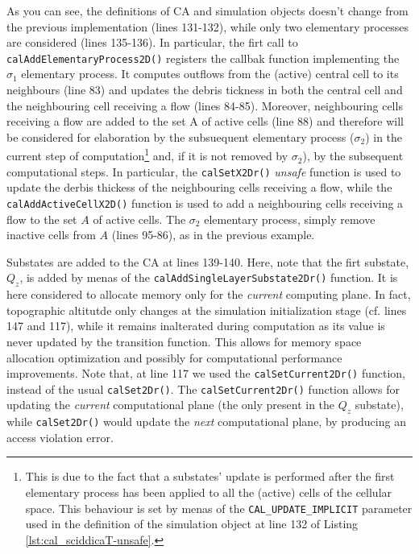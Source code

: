 As you can see, the definitions of CA and simulation objects doesn't
change from the previous implementation (lines 131-132), while only
two elementary processes are considered (lines 135-136). In
particular, the firt call to \verb'calAddElementaryProcess2D()'
registers the callbak function implementing the $\sigma_1$ elementary
process. It computes outflows from the (active) central cell to its
neighbours (line 83) and updates the debris tickness in both the
central cell and the neighbouring cell receiving a flow (lines
84-85). Moreover, neighbouring cells receiving a flow are added to the
set A of active cells (line 88) and therefore will be considered for
elaboration by the subsuequent elementary process ($\sigma_2$) in the
current step of computation\footnote{This is due to the fact that a
  substates' update is performed after the first elementary process
  has been applied to all the (active) cells of the cellular
  space. This behaviour is set by menas of the
  \texttt{CAL\_UPDATE\_IMPLICIT} parameter used in the definition of
  the simulation object at line 132 of Listing
  \ref{lst:cal_sciddicaT-unsafe}.} and, if it is not removed by
$\sigma_2$), by the subsequent computational steps. In particular, the
\verb'calSetX2Dr()' \emph{unsafe} function is used to update the
derbis thickess of the neighbouring cells receiving a flow, while the
\verb'calAddActiveCellX2D()' function is used to add a neighbouring
cells receiving a flow to the set $A$ of active cells.  The $\sigma_2$
elementary process, simply remove inactive cells from $A$ (lines
95-86), as in the previous example.


Substates are added to the CA at lines 139-140. Here, note that the
firt substate, $Q_z$, is added by menas of the
\verb'calAddSingleLayerSubstate2Dr()' function. It is here considered
to allocate memory only for the \emph{current} computing plane. In
fact, topographic altitutde only changes at the simulation
initialization stage (cf. lines 147 and 117), while it remains
inalterated during computation as its value is never updated by the
transition function. This allows for memory space allocation
optimization and possibly for computational performance
improvements. Note that, at line 117 we used the
\verb'calSetCurrent2Dr()' function, instead of the usual
\verb'calSet2Dr()'. The \verb'calSetCurrent2Dr()' function  allows for updating the \emph{current} computational plane (the only present in the $Q_z$ substate), while \verb'calSet2Dr()' would update the \emph{next}
computational plane, by producing an access violation error.

